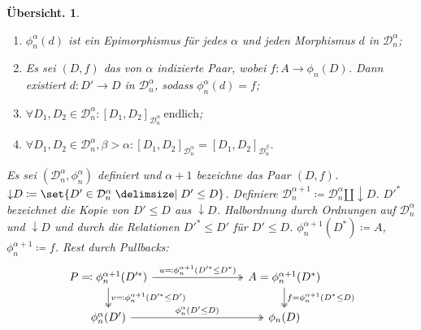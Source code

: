 \documentclass[a4paper, parskip=half,11pt]{scrartcl}
\theoremstyle{marginbreak}
\theoremstyle{nonumberplain}
\newtheorem{overview}{Übersicht.}
\newcommand\cat\mathcal
\newcommand{\down}[1]{{\downarrow}#1}
\newcommand{\n}{\pgfmatrixnextcell}
\begin{document}
{\begin{overview}
\begin{enumerate}[label=(\alph*),noitemsep]
				\item $\phi_n^\alpha(d)$ ist ein Epimorphismus für jedes $\alpha$ und jeden
					Morphismus $d$ in $\cat{D}_n^\alpha$;
				\item Es sei $(D, f)$ das von $\alpha$ indizierte Paar, wobei
					$f\colon A\to\phi_n(D)$. Dann existiert $d\colon D'\to D$ in
					$\cat{D}_n^\alpha$, sodass $\phi_n^\alpha(d) = f$;
				\item $\forall D_1, D_2\in\cat{D}_{n}^\alpha: [D_1, D_2]_{\cat{D}_n^\alpha}~\text{endlich}$;
				\item $\forall D_1, D_2\in\cat{D}_{n}^\alpha, \beta>\alpha: [D_1, D_2]_{\cat{D}_n^\alpha} = [D_1, D_2]_{\cat{D}_{n}^{\beta}}$.
			\end{enumerate}
			Es sei $(\cat{D}_n^\alpha,
			\phi_n^\alpha)$ definiert und $\alpha+1$ bezeichne das Paar $(D, f)$.
			$\down{D}\coloneqq\set{D'\in\cat{D}_n^\alpha\given D'\leq D}$. Definiere
			$\cat{D}_n^{\alpha+1}\coloneqq\cat{D}_n^\alpha\amalg\down{D}$. $D'^*$
			bezeichnet die Kopie von $D'\leq D$ aus $\down{D}$. Halbordnung durch
			Ordnungen auf $\cat{D}_n^\alpha$ und $\down{D}$ und durch die Relationen
			$D'^*\leq D'$ für $D'\leq D$. $\phi_n^{\alpha+1}(D^*)\coloneqq A$,
			$\phi_n^{\alpha+1}\coloneqq f$. Rest durch Pullbacks:
			\[
				\begin{tikzcd}[column sep=8em]
					P \eqqcolon \phi_n^{\alpha+1}(D'^*)
						\ar[two heads]{d}{v\eqqcolon \phi_n^{\alpha + 1}(D'^*\leq D')}
						\ar[two heads]{r}{u\eqqcolon \phi_n^{\alpha+1}(D'^*\leq D^*)}
					\n A=\phi_n^{\alpha+1}(D^*)
						\ar[two heads]{d}{f = \phi_n^{\alpha+1}(D^*\leq D)}\\
					\phi_n^\alpha(D') \ar[two heads]{r}{\phi_n^\alpha(D'\leq D)} \n \phi_n(D)
				\end{tikzcd}
			\]
		\end{overview}}
\end{document}
